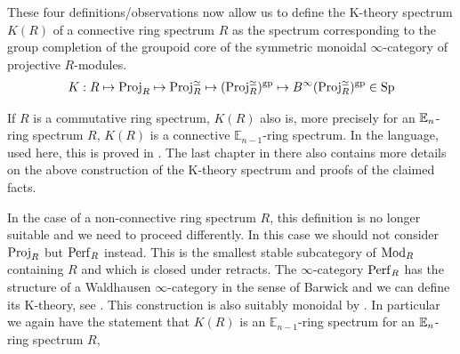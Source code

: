 These four definitions/observations now allow us to define the K-theory spectrum $K(R)$ of a connective ring spectrum $R$ as the spectrum corresponding to the group completion of the groupoid core of the symmetric monoidal $\infty$-category of projective $R$-modules. 
\begin{align*}
        K: R\mapsto \operatorname{Proj}_R\mapsto \operatorname{Proj}_R^{\simeq}\mapsto (\operatorname{Proj}_R^{\simeq})^{\operatorname{gp}}\mapsto B^{\infty}(\operatorname{Proj}_R^{\simeq})^{\operatorname{gp}}\in \operatorname{Sp}
\end{align*}
\begin{rmk}
    If $R$ is a commutative ring spectrum, $K(R)$ also is, more precisely for an $\mathbb{E}_n$-ring spectrum $R$, $K(R)$ is a connective $\mathbb{E}_{n-1}$-ring spectrum. In the language, used here, this is proved in \cite{GGNuniversalityloop}. The last chapter in there also contains more details on the above construction of the K-theory spectrum and proofs of the claimed facts.
\end{rmk}
\begin{rmk}
    In the case of a non-connective ring spectrum $R$, this definition is no longer suitable and we need to proceed differently. In this case we should not consider $\operatorname{Proj}_R$ but $\operatorname{Perf}_R$ instead. This is the smallest stable subcategory of $\operatorname{Mod}_R$ containing $R$ and which is closed under retracts. The $\infty$-category $\operatorname{Perf}_R$ has the structure of a Waldhausen $\infty$-category in the sense of Barwick and we can define its K-theory, see \cite[Chapter~11]{barwickK-theory}. This construction is also suitably monoidal by \cite[Proposition~3.8]{barwick2013multiplicative}. In particular we again have the statement that $K(R)$ is an $\mathbb{E}_{n-1}$-ring spectrum for an $\mathbb{E}_n$-ring spectrum $R$, 
\end{rmk}
